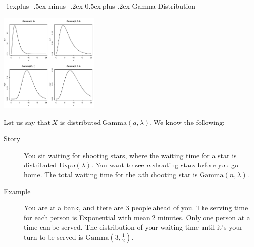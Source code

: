 \documentclass[6pt, landscape]{article}
\makeatletter
\renewcommand{\subsection}{\@startsection{subsection}{2}{0mm}%
                                {-1explus -.5ex minus -.2ex}%
                                {0.5ex plus .2ex}%
                                {\small\bfseries}}
\newcommand{\Gam}{\textrm{Gamma}}
\newcommand{\Expo}{\textrm{Expo}}
\makeatother
\begin{document}
\begin{multicols}{3}
        \subsection{Gamma Distribution}
        \begin{minipage}{\linewidth}
                \centering
                \includegraphics[width=1.9in]{figures/gammapdfs.pdf}
        \end{minipage}
        \medskip
        Let us say that $X$ is distributed $\Gam(a, \lambda)$. We know the following:
        \begin{description}
                \item[Story] You sit waiting for shooting stars, where the waiting time for a star is distributed $\Expo(\lambda)$. You want to see $n$ shooting stars before you go home. The total waiting time for the $n$th shooting star is $\Gam(n,\lambda)$.
                \item[Example]  You are at a bank, and there are 3 people ahead of you. The serving time for each person is Exponential with mean $2$ minutes. Only one person at a time can be served. The distribution of your waiting time until it's your turn to be served is $\Gam(3, \frac{1}{2})$.

        \end{description}


\end{multicols}
\end{document}
